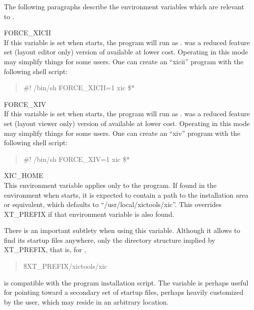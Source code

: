 The following paragraphs describe the environment variables which are
relevant to {\Xic}.

\begin{description}
\item{\et FORCE\_XICII}\\
If this variable is set when {\Xic} starts, the program will run as
{\XicII}.  {\XicII} was a reduced feature set (layout editor only)
version of {\Xic} available at lower cost.  Operating in this mode may
simplify things for some users.  One can create an ``{\vt xicii}''
program with the following shell script:

\begin{quote}\vt
\#! /bin/sh\newline\newline
FORCE\_XICII=1 xic \$*
\end{quote}

\item{\et FORCE\_XIV}\\
If this variable is set when {\Xic} starts, the program will run as
{\Xiv}.  {\Xiv} was a reduced feature set (layout viewer only) version
of {\Xic} available at lower cost.  Operating in this mode may
simplify things for some users.  One can create an ``{\vt xiv}''
program with the following shell script:

\begin{quote}\vt
\#! /bin/sh\newline\newline
FORCE\_XIV=1 xic \$*
\end{quote}

\item{\et XIC\_HOME}\\
This environment variable applies only to the {\Xic} program.  If
found in the environment when {\Xic} starts, it is expected to contain
a path to the {\Xic} installation area or equivalent, which defaults
to ``{\vt /usr/local/xictools/xic}''.  This overrides {\et XT\_PREFIX}
if that environment variable is also found.
 
There is an important subtlety when using this variable.  Although it
allows {\Xic} to find its startup files anywhere, only the directory
structure implied by {\et XT\_PREFIX}, that is, for {\Xic},
\begin{quote} \vt
\$XT\_PREFIX/xictools/xic
\end{quote}
is compatible with the program installation script.  The variable is
perhaps useful for pointing {\Xic} toward a secondary set of startup
files, perhaps heavily customized by the user, which may reside in
an arbitrary location.


\end{description}
